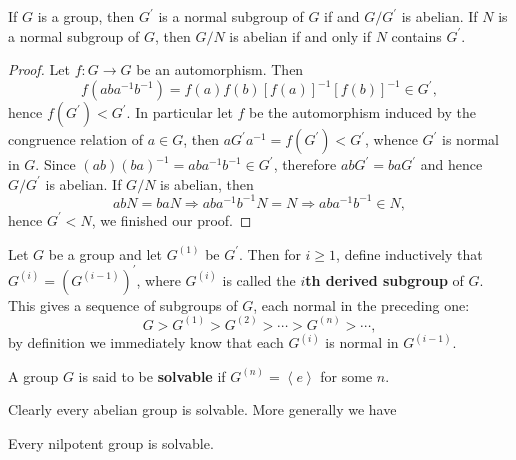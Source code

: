 \begin{theorem}
If $G$ is a group, then $G^\prime$ is a normal subgroup of $G$ if and $G/G^\prime$ is abelian. If $N$ is a normal subgroup of $G$, then $G/N$ is abelian if and only if $N$ contains $G^\prime$.
\end{theorem}
\begin{proof}
Let $f:G\to G$ be an automorphism. Then 
$$
f\left( aba^{-1}b^{-1} \right) =f\left( a \right) f\left( b \right) \left[ f\left( a \right) \right] ^{-1}\left[ f\left( b \right) \right] ^{-1}\in G^{\prime},
$$
hence $f(G^\prime)<G^\prime$. In particular let $f$ be the automorphism induced by the congruence relation of $a\in G$, then $aG^{\prime}a^{-1}=f\left( G^{\prime} \right) <G^{\prime}$, whence $G^\prime$ is normal in $G$. Since $(ab)(ba)^{-1}=aba^{-1}b^{-1}\in G^\prime$, therefore $abG^\prime=baG^\prime$ and hence $G/G^\prime$ is abelian. If $G/N$ is abelian, then 
$$
abN=baN\Rightarrow aba^{-1}b^{-1}N=N\Rightarrow aba^{-1}b^{-1}\in N,
$$
hence $G^\prime<N$, we finished our proof.
\end{proof}
Let $G$ be a group and let $G^{(1)}$ be $G^\prime$. Then for $i\ge 1$, define inductively that $G^{(i)}=(G^{(i-1)})^\prime$, where $G^{(i)}$ is called the \textbf{$i$th derived subgroup} of $G$. This gives a sequence of subgroups of $G$, each normal in the preceding one: 
$$
G>G^{\left( 1 \right)}>G^{\left( 2 \right)}>\cdots >G^{\left( n \right)}>\cdots ,
$$
by definition we immediately know that each $G^{(i)}$ is normal in $G^{(i-1)}$.
\begin{definition}
A group $G$ is said to be \textbf{solvable} if $G^{(n)}=\left<e\right>$ for some $n$.
\end{definition}
Clearly every abelian group is solvable. More generally we have 
\begin{proposition}
Every nilpotent group is solvable.
\end{proposition}
